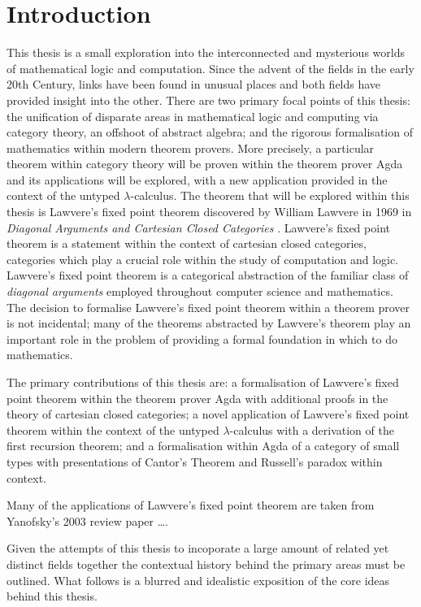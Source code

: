 
\section{Introduction}

This thesis is a small exploration into the interconnected and mysterious worlds
of mathematical logic and computation. Since the advent of the fields in the
early 20th Century, links have been found in unusual places and both fields have
provided insight into the other. There are two primary focal points of this
thesis: the unification of disparate areas in mathematical logic and computing
via category theory, an offshoot of abstract algebra; and the rigorous
formalisation of mathematics within modern theorem provers. More precisely, a
particular theorem within category theory will be proven within the theorem
prover Agda and its applications will be explored, with a new application
provided in the context of the untyped $\lambda$-calculus. The theorem that will
be explored within this thesis is Lawvere's fixed point theorem discovered by
William Lawvere in 1969 in \textit{Diagonal Arguments and Cartesian Closed
Categories} \cite{lawvere1969diagonal}. Lawvere's fixed point theorem
is a statement within the context of cartesian closed categories, categories
which play a crucial role within the study of computation and logic. Lawvere's
fixed point theorem is a categorical abstraction of the familiar class of
\textit{diagonal arguments} employed throughout computer science and mathematics. The
decision to formalise Lawvere's fixed point theorem within a theorem prover is
not incidental; many of the theorems abstracted by Lawvere's theorem play an
important role in the problem of providing a formal foundation in which to do
mathematics.

The primary contributions of this thesis are: a formalisation of Lawvere's fixed
point theorem within the theorem prover Agda with additional proofs in the
theory of cartesian closed categories; a novel application of Lawvere's fixed
point theorem within the context of the untyped $\lambda$-calculus with a
derivation of the first recursion theorem; and a formalisation within Agda of a
category of small types with presentations of Cantor's Theorem and Russell's
paradox within context.

Many of the applications of Lawvere's fixed point theorem are taken from
Yanofsky's 2003 review paper \ldots {}.

Given the attempts of this thesis to incoporate a large amount of related yet
distinct fields together the contextual history behind the primary areas must be
outlined. What follows is a blurred and idealistic exposition of the core ideas
behind this thesis.

